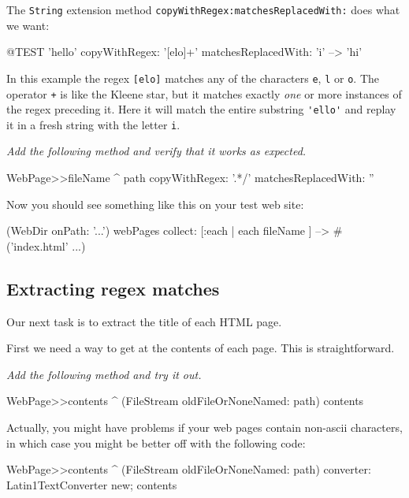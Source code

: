 \documentclass[10pt,twoside,chapterprefix=false]{scrbook}
\newcommand{\highlight}[1]{\textcolor{blue!65}{#1}}
\newcommand{\MarginLabel}[1]{%
	\marginnote{\textbf{#1}}}
\newcommand{\vartriangleout}{\ifthenelse{\isodd{\thepage}}{\vartriangleright}{\vartriangleleft}}
\renewcommand{\dothis}[1]{%
	\noindent\par\noindent
	{\reversemarginpar
		\marginnote{\fcolorbox{blue!65}{white}{\highlight{$\vartriangleout$}}}}
	\noindent\emph{#1}
	\nopagebreak}
\renewcommand{\ct}{\lstinline[mathescape=false,basicstyle={\sffamily\upshape}]}
\begin{document}
The \ct{String} extension method \ct{copyWithRegex:matchesReplacedWith:}
does what we want:

\begin{ToSh-code}{@TEST}
'hello' copyWithRegex: '[elo]+' matchesReplacedWith: 'i' --> 'hi'
\end{ToSh-code}

In this example the regex \ct{[elo]} matches any of the characters
\ct{e}, \ct{l} or \ct{o}. The operator \ct{+} is like the Kleene star,
but it matches exactly \emph{one} or more instances of the regex
preceding it. Here it will match the entire substring \ct{'ello'} and
replay it in a fresh string with the letter \ct{i}.

\dothis{Add the following method and verify that it works as expected.}

\begin{ToSh-code}{}
WebPage>>fileName
	^ path copyWithRegex: '.*/' matchesReplacedWith: ''
\end{ToSh-code}

Now you should see something like this on your test web site:

\begin{ToSh-code}{}
(WebDir onPath: '...') webPages collect: [:each | each fileName ]
  --> #('index.html' ...)
\end{ToSh-code}

\subsection{Extracting regex matches}

Our next task is to extract the title of each HTML page.

First we need a way to get at the contents of each page. This is straightforward.

\dothis{Add the following method and try it out.}

\begin{ToSh-code}{}
WebPage>>contents
	^ (FileStream oldFileOrNoneNamed: path) contents
\end{ToSh-code}

Actually, you might have problems if your web pages contain non-ascii
characters, in which case you might be better off with the following
code:

\begin{ToSh-code}{}
WebPage>>contents
	^ (FileStream oldFileOrNoneNamed: path)
		converter: Latin1TextConverter new;
		contents
\end{ToSh-code}
\end{document}

